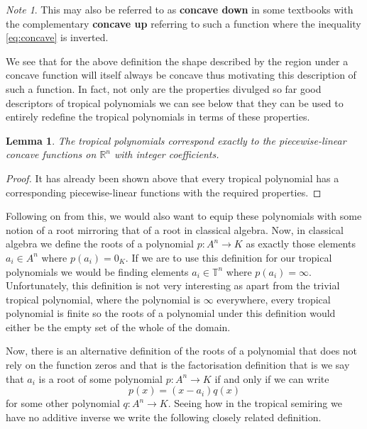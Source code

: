 \documentclass[12pt,a4paper]{amsart}
\newcommand{\R}{\mathbb{R}}
\newcommand{\T}{\mathbb{T}}
\newtheorem{lem}[thm]{Lemma}
\theoremstyle{definition}
\theoremstyle{remark}
\newtheorem*{note}{Note}
\begin{document}
\begin{note}
This may also be referred to as \textbf{concave down} in some textbooks with the complementary \textbf{concave up} referring to such a function where the inequality \eqref{eq:concave} is inverted.
\end{note}

We see that for the above definition the shape described by the region under a concave function will itself always be concave thus motivating this description of such a function. In fact, not only are the properties divulged so far good descriptors of tropical polynomials we can see below that they can be used to entirely redefine the tropical polynomials in terms of these properties.

\begin{lem}
The tropical polynomials correspond exactly to the piecewise-linear concave functions on $\R^n$ with integer coefficients.
\end{lem}
\begin{proof}
It has already been shown above that every tropical polynomial has a corresponding piecewise-linear functions with the required properties.
\end{proof}

Following on from this, we would also want to equip these polynomials with some notion of a root mirroring that of a root in classical algebra. Now, in classical algebra we define the roots of a polynomial $p:A^n\to K$ as exactly those elements $a_i\in A^n$ where $p(a_i)=0_K$. If we are to use this definition for our tropical polynomials we would be finding elements $a_i\in\T^n$ where $p(a_i)=\infty$.
Unfortunately, this definition is not very interesting as apart from the trivial tropical polynomial, where the polynomial is $\infty$ everywhere, every tropical polynomial is finite so the roots of a polynomial under this definition would either be the empty set of the whole of the domain.

Now, there is an alternative definition of the roots of a polynomial that does not rely on the function zeros and that is the factorisation definition that is we say that $a_i$ is a root of some polynomial $p:A^n\to K$ if and only if we can write
\begin{equation}
    p(x) = (x - a_i)q(x)
\end{equation}
for some other polynomial $q:A^n\to K$. Seeing how in the tropical semiring we have no additive inverse we write the following closely related definition.
\end{document}
